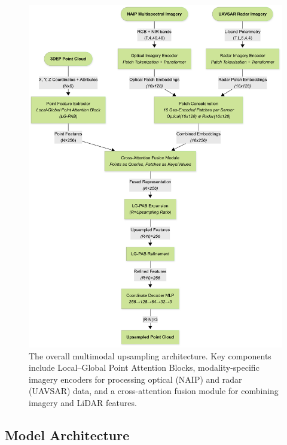 \documentclass[preprints,article,accept,pdftex,moreauthors]{Definitions/mdpi}
\begin{document}
\begin{figure}
    \vspace{-20pt}  
    \centering
    \includegraphics[trim=0mm 0mm 0mm 9mm, clip, width=1\linewidth]{manuscript/figures/Overall_Architecture.png}
    \caption{The overall multimodal upsampling architecture. Key components include Local–Global Point Attention Blocks, modality-specific imagery encoders for processing optical (NAIP) and radar (UAVSAR) data, and a cross-attention fusion module for combining imagery and LiDAR features.}
    \label{fig:pipeline}
\end{figure}


\subsection{Model Architecture}
\label{sec:architecture}
\end{document}
